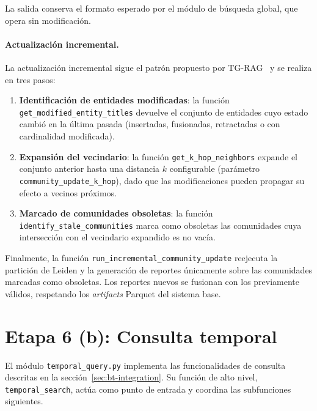 La salida conserva el formato esperado por el módulo de búsqueda global, que opera sin modificación.

\paragraph{Actualización incremental.}
La actualización incremental sigue el patrón propuesto por TG-RAG~\cite{tg_rag2025} y se realiza en tres pasos:

\begin{enumerate}
  \item \textbf{Identificación de entidades modificadas}: la función \texttt{get\_modified\_entity\_titles} devuelve el conjunto de entidades cuyo estado cambió en la última pasada (insertadas, fusionadas, retractadas o con cardinalidad modificada).
  \item \textbf{Expansión del vecindario}: la función \texttt{get\_k\_hop\_neighbors} expande el conjunto anterior hasta una distancia $k$ configurable (parámetro \texttt{community\_update\_k\_hop}), dado que las modificaciones pueden propagar su efecto a vecinos próximos.
  \item \textbf{Marcado de comunidades obsoletas}: la función \texttt{identify\_stale\_communities} marca como obsoletas las comunidades cuya intersección con el vecindario expandido es no vacía.
\end{enumerate}

Finalmente, la función \texttt{run\_incremental\_community\_update} reejecuta la partición de Leiden y la generación de reportes únicamente sobre las comunidades marcadas como obsoletas. Los reportes nuevos se fusionan con los previamente válidos, respetando los \emph{artifacts} Parquet del sistema base.

\section{Etapa 6 (b): Consulta temporal}\label{sec:impl-query}

El módulo \texttt{temporal\_query.py} implementa las funcionalidades de consulta descritas en la sección~\ref{sec:bt-integration}. Su función de alto nivel, \texttt{temporal\_search}, actúa como punto de entrada y coordina las subfunciones siguientes.

